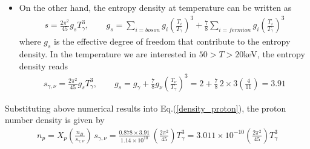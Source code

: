 \documentclass[Universe,article,submit,moreauthors,pdftex]{Definitions/mdpi}
\begin{document}
\begin{itemize}
  \item On the other hand, the entropy density at temperature can be written as \cite{Kolb:1990vq}
\begin{align}
s=\frac{2\pi^2}{45}g_sT_\gamma^3,\qquad g_s=\sum_{i=boson}g_i\left(\frac{T_i}{T_\gamma}\right)^3+\frac{7}{8}\sum_{i=fermion}g_i\left(\frac{T_i}{T_\gamma}\right)^3
\end{align}
where $g_s$ is the effective degree of freedom that contribute to the entropy density.  In the temperature we are interested in $50>T>20$keV, the entropy density reads
\begin{align}
s_{\gamma,\nu}=\frac{2\pi^2}{45}g_sT_\gamma^3,\qquad g_s=g_\gamma+\frac{7}{8}g_\nu\left(\frac{T_\nu}{T_\gamma}\right)^3=2+\frac{7}{8}\,2\times3\left(\frac{4}{11}\right)=3.91
\end{align}
\end{itemize}

Substituting above numerical results into Eq.(\ref{density_proton}), the proton number density is given by
\begin{align}
n_p= X_p\left(\frac{n_B}{s_{\gamma,\nu}}\right)\,s_{\gamma,\nu}=\frac{0.878\times3.91}{1.14\times10^{10}}\,\left(\frac{2\pi^2}{45}\right)T_\gamma^3=3.011\times10^{-10}\left(\frac{2\pi^2}{45}\right)T_\gamma^3
\end{align}
\end{document}
